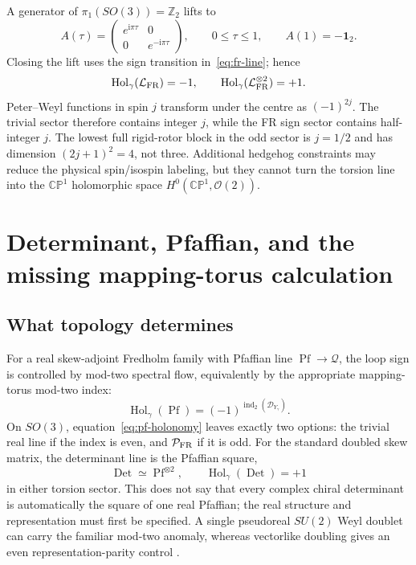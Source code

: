 \documentclass[11pt]{article}
\theoremstyle{definition}
\theoremstyle{remark}
\newcommand{\ii}{\mathrm i}
\newcommand{\ZZ}{\mathbb Z}
\newcommand{\CP}{\mathbb {CP}}
\newcommand{\cO}{\mathcal O}
\newcommand{\cL}{\mathcal L}
\newcommand{\cP}{\mathcal P}
\newcommand{\cQ}{\mathcal Q}
\newcommand{\Hol}{\operatorname{Hol}}
\newcommand{\Pf}{\operatorname{Pf}}
\newcommand{\Det}{\operatorname{Det}}
\newcommand{\indtwo}{\operatorname{ind}_{2}}
\begin{document}
A generator of \(\pi_1(SO(3))=\ZZ_2\) lifts to
\begin{equation}
 A(\tau)=
 \begin{pmatrix}e^{\ii\pi\tau}&0\\0&e^{-\ii\pi\tau}\end{pmatrix},
 \qquad 0\leq\tau\leq1,\qquad A(1)=-\bm1_2.
 \label{eq:generator-loop}
\end{equation}
Closing the lift uses the sign transition in~\eqref{eq:fr-line}; hence
\begin{equation}
 \Hol_\gamma(\cL_{\rm FR})=-1,
 \qquad \Hol_\gamma(\cL_{\rm FR}^{\otimes2})=+1.
 \label{eq:fr-holonomy}
\end{equation}
Peter--Weyl functions in spin \(j\) transform under the centre as
\((-1)^{2j}\).  The trivial sector therefore contains integer \(j\), while
the FR sign sector contains half-integer \(j\).  The lowest full rigid-rotor
block in the odd sector is \(j=1/2\) and has dimension
\((2j+1)^2=4\), not three.  Additional hedgehog constraints may reduce the
physical spin/isospin labeling, but they cannot turn the torsion line into
the \(\CP^1\) holomorphic space \(H^0(\CP^1,\cO(2))\).

\section{Determinant, Pfaffian, and the missing mapping-torus calculation}

\subsection{What topology determines}

For a real skew-adjoint Fredholm family with Pfaffian line \(\Pf\to\cQ\),
the loop sign is controlled by mod-two spectral flow, equivalently by the
appropriate mapping-torus mod-two index:
\begin{equation}
 \Hol_\gamma(\Pf)=(-1)^{\indtwo(\mathscr D_{Y_\gamma})}.
 \label{eq:pf-holonomy}
\end{equation}
On \(SO(3)\), equation~\eqref{eq:pf-holonomy} leaves exactly two options:
the trivial real line if the index is even, and \(\cP_{\rm FR}\) if it is
odd.  For the standard doubled skew matrix, the determinant line is the
Pfaffian square,
\begin{equation}
 \Det\simeq\Pf^{\otimes2},
 \qquad \Hol_\gamma(\Det)=+1
 \label{eq:det-pf-square}
\end{equation}
in either torsion sector.  This does not say that every complex chiral
determinant is automatically the square of one real Pfaffian; the real
structure and representation must first be specified.  A single
pseudoreal \(SU(2)\) Weyl doublet can carry the familiar mod-two anomaly,
whereas vectorlike doubling gives an even representation-parity control
\cite{Witten1982APE7}.
\end{document}
